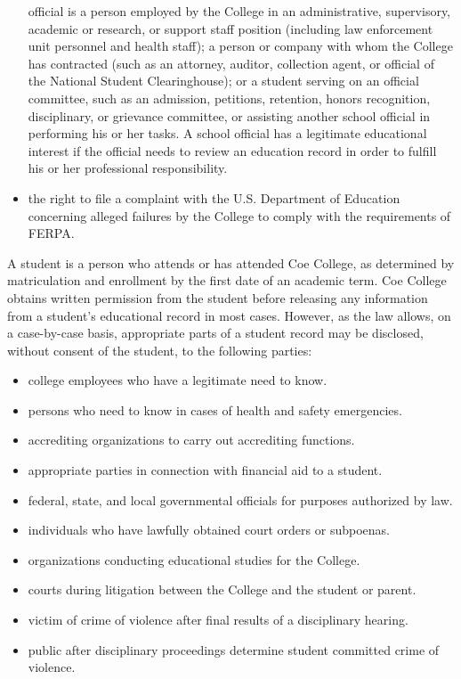 \documentclass[
  letterpaper,
]{scrbook}
\providecommand{\tightlist}{%
  \setlength{\itemsep}{0pt}\setlength{\parskip}{0pt}}
\begin{document}
\begin{itemize}
  official is a person employed by the College in an administrative,
  supervisory, academic or research, or support staff position
  (including law enforcement unit personnel and health staff); a person
  or company with whom the College has contracted (such as an attorney,
  auditor, collection agent, or official of the National Student
  Clearinghouse); or a student serving on an official committee, such as
  an admission, petitions, retention, honors recognition, disciplinary,
  or grievance committee, or assisting another school official in
  performing his or her tasks. A school official has a legitimate
  educational interest if the official needs to review an education
  record in order to fulfill his or her professional responsibility.
\item
  the right to file a complaint with the U.S. Department of Education
  concerning alleged failures by the College to comply with the
  requirements of FERPA.
\end{itemize}

A student is a person who attends or has attended Coe College, as
determined by matriculation and enrollment by the first date of an
academic term. Coe College obtains written permission from the student
before releasing any information from a student's educational record in
most cases. However, as the law allows, on a case-by-case basis,
appropriate parts of a student record may be disclosed, without consent
of the student, to the following parties:

\begin{itemize}
\tightlist
\item
  college employees who have a legitimate need to know.
\item
  persons who need to know in cases of health and safety emergencies.
\item
  accrediting organizations to carry out accrediting functions.
\item
  appropriate parties in connection with financial aid to a student.
\item
  federal, state, and local governmental officials for purposes
  authorized by law.
\item
  individuals who have lawfully obtained court orders or subpoenas.
\item
  organizations conducting educational studies for the College.
\item
  courts during litigation between the College and the student or
  parent.
\item
  victim of crime of violence after final results of a disciplinary
  hearing.
\item
  public after disciplinary proceedings determine student committed
  crime of violence.
\end{itemize}
\end{document}
